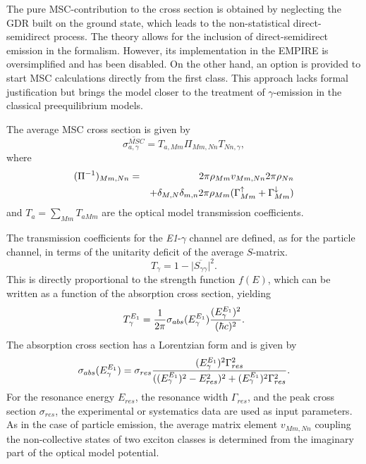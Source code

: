 The pure MSC-contribution to the cross section is obtained by neglecting
the GDR built on the ground state, which leads to the non-statistical
direct-semidirect process. The theory \cite{GammaMSC} allows for the
inclusion of direct-semidirect emission in the formalism.
However, its implementation in the EMPIRE is oversimplified
and has been disabled.
On the other hand, an option is provided to start MSC
calculations directly from the first class. This approach lacks
formal justification but brings the model closer to the treatment of
$\gamma$-emission in the classical preequilibrium models.

The average MSC cross section is given by
\begin{equation}
\overline{\sigma_{a,\gamma}^{MSC}}=T_{a,Mm}\Pi_{Mm,Nn}T_{Nn,\gamma},
\label{GammaMSCxs}
\end{equation}
where
\begin{eqnarray}
(\Pi^{-1})_{Mm,Nn} & = & 2\pi\rho_{Mm}v_{Mm,Nn}2\pi\rho_{Nn}  \notag \\
& &
+\delta_{M,N}\delta_{m,n}2\pi\rho_{Mm}(\Gamma_{Mm}^{\uparrow}+\Gamma_{Mm}^{%
\downarrow})  \label{Pigamma}
\end{eqnarray}
and $T_{a}=\sum_{Mm}T_{aMm}$ are the optical model transmission coefficients.

The transmission coefficients for the \emph{E1}-$\gamma$ channel are
defined, as for the particle channel, in terms of the unitarity deficit of
the average $S$-matrix.
\begin{equation}
T_{\gamma}=1-\Big|\overline{S_{\gamma\gamma}}\Big|^{2}.
\end{equation}
This is directly proportional to the strength function $f(E)$, which can be
written as a function of the absorption cross section, yielding
\begin{equation}
T_{\gamma}^{E_{1}}=\frac{1}{2\pi}\sigma_{abs}(E_{\gamma}^{E_{1}})\frac{%
(E_{\gamma}^{E_{1}})^{2}}{(\hbar c)^{2}}.
\end{equation}
The absorption cross section has a Lorentzian form and is given by
\begin{equation}
\sigma_{abs}(E_{\gamma}^{E_{1}})=\sigma_{res}\frac{(E_{\gamma}^{E_{1}})^{2}%
\Gamma_{res}^{2}}{((E_{\gamma}^{E_{1}})^{2}-E_{res}^{2})^{2}+(E_{%
\gamma}^{E_{1}})^{2}\Gamma_{res}^{2}}.
\end{equation}
For the resonance energy $E_{res}$, the resonance width $\Gamma_{res}$, and
the peak cross section $\sigma_{res}$, the experimental or systematics data
are used as input parameters. As in the case of particle emission, the
average matrix element $v_{Mm,Nn}$ coupling the non-collective states of two
exciton classes is determined from the imaginary part of the optical model
potential.

